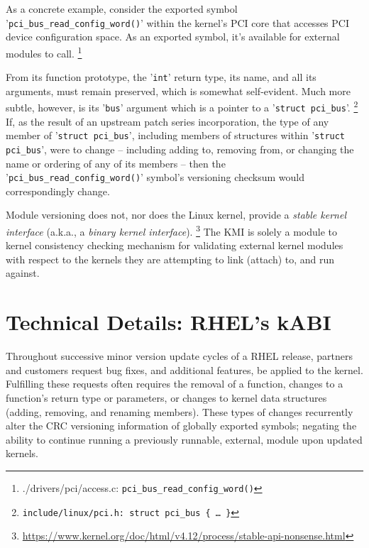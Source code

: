 \documentclass[10pt,oneside,english]{book}
\begin{document}
As a concrete example, consider the exported symbol '\texttt{pci\_bus\_read\_config\_word()}'
within the kernel's PCI core that accesses PCI device configuration
space. As an exported symbol, it's available for external modules
to call. \footnote{./drivers/pci/access.c: \texttt{pci\_bus\_read\_config\_word()}}


From its function prototype, the '\texttt{int}' return type, its name,
and all its arguments, must remain preserved, which is somewhat self-evident.
Much more subtle, however, is its '\texttt{bus}' argument which is
a pointer to a '\texttt{struct pci\_bus}'. \footnote{\texttt{\label{fn:c1f6}include/linux/pci.h: struct pci\_bus \{ …
\}}} If, as the result of an upstream patch series incorporation, the
type of any member of '\texttt{struct pci\_bus}', including members
of structures within '\texttt{struct pci\_bus}', were to change --
including adding to, removing from, or changing the name or ordering
of any of its members -- then the '\texttt{pci\_bus\_read\_config\_word()}'
symbol's versioning checksum would correspondingly change.

Module versioning does not, nor does the Linux kernel, provide a \emph{stable
kernel interface} (a.k.a., a \emph{binary kernel interface}). \footnote{\href{https://www.kernel.org/doc/html/v4.12/process/stable-api-nonsense.html}{https://www.kernel.org/doc/html/v4.12/process/stable-api-nonsense.html}}
The KMI is solely a module to kernel consistency checking mechanism
for validating external kernel modules with respect to the kernels
they are attempting to link (attach) to, and run against.

\chapter{Technical Details: RHEL's kABI}

Throughout successive minor version update cycles of a RHEL release,
partners and customers request bug fixes, and additional features,
be applied to the kernel. Fulfilling these requests often requires
the removal of a function, changes to a function's return type or
parameters, or changes to kernel data structures (adding, removing,
and renaming members). These types of changes recurrently alter the
CRC versioning information of globally exported symbols; negating
the ability to continue running a previously runnable, external, module
upon updated kernels.
\end{document}
